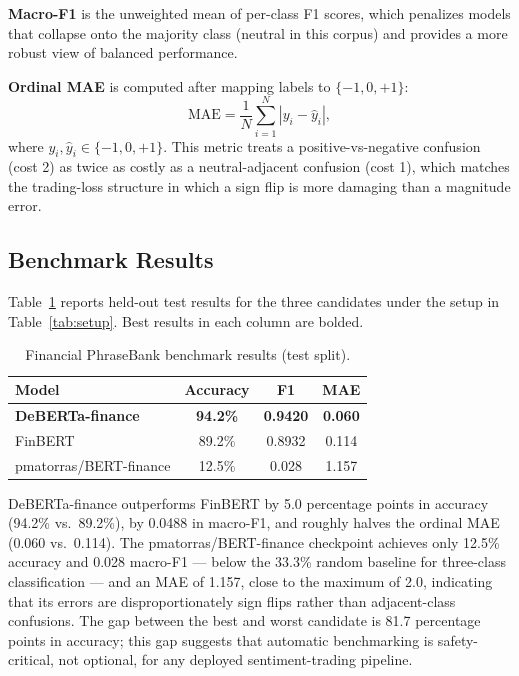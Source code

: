 \documentclass[conference]{IEEEtran}
\begin{document}
\smallskip
\noindent\textbf{Macro-F1} is the unweighted mean of per-class F1 scores,
which penalizes models that collapse onto the majority class (neutral in this
corpus) and provides a more robust view of balanced performance.

\smallskip
\noindent\textbf{Ordinal MAE} is computed after mapping labels to
$\{-1, 0, +1\}$:
\[
  \mathrm{MAE} = \frac{1}{N}\sum_{i=1}^{N} |y_i - \hat{y}_i|,
\]
where $y_i, \hat{y}_i \in \{-1, 0, +1\}$. This metric treats a
positive-vs-negative confusion (cost 2) as twice as costly as a
neutral-adjacent confusion (cost 1), which matches the trading-loss structure
in which a sign flip is more damaging than a magnitude error.

\subsection{Benchmark Results}
\label{sec:results}

Table~\ref{tab:results} reports held-out test results for the three
candidates under the setup in Table~\ref{tab:setup}. Best results in each
column are bolded.

\begin{table}[t]
\caption{Financial PhraseBank benchmark results (test split).}
\label{tab:results}
\centering
\renewcommand{\arraystretch}{1.15}
\begin{tabular}{lccc}
\toprule
\textbf{Model} & \textbf{Accuracy} & \textbf{F1} & \textbf{MAE} \\
\midrule
\textbf{DeBERTa-finance} & \textbf{94.2\%} & \textbf{0.9420} & \textbf{0.060} \\
FinBERT                  & 89.2\%          & 0.8932          & 0.114          \\
pmatorras/BERT-finance   & 12.5\%          & 0.028           & 1.157          \\
\bottomrule
\end{tabular}
\end{table}

DeBERTa-finance outperforms FinBERT by 5.0 percentage points in accuracy
(94.2\% vs.\ 89.2\%), by 0.0488 in macro-F1, and roughly halves the ordinal
MAE (0.060 vs.\ 0.114). The pmatorras/BERT-finance checkpoint achieves only
12.5\% accuracy and 0.028 macro-F1 --- below the 33.3\% random baseline for
three-class classification --- and an MAE of 1.157, close to the maximum of
2.0, indicating that its errors are disproportionately sign flips rather than
adjacent-class confusions. The gap between the best and worst candidate is
81.7 percentage points in accuracy; this gap suggests that automatic
benchmarking is safety-critical, not optional, for any deployed
sentiment-trading pipeline.
\end{document}
